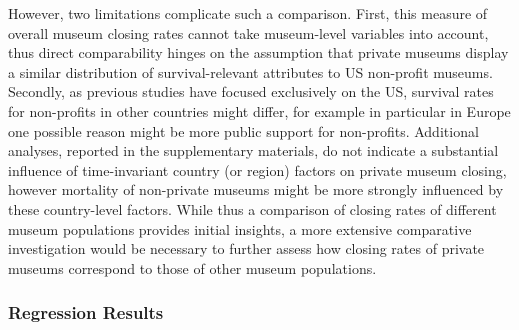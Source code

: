 \documentclass[12pt]{article}
\begin{document}
However, two limitations complicate such a comparison.
First, this measure of overall museum closing rates cannot take museum-level variables into account, thus direct comparability hinges on the assumption that private museums display a similar distribution of survival-relevant attributes to US non-profit museums.
Secondly, as previous studies have focused exclusively on the US, survival rates for non-profits in other countries might differ, for example in particular in Europe one possible reason might be more public support for non-profits.
Additional analyses, reported in the supplementary materials, do not indicate a substantial influence of time-invariant country (or region) factors on private museum closing, however mortality of non-private museums might be more strongly influenced by these country-level factors.
While thus a comparison of closing rates of different museum populations provides initial insights, a more extensive comparative investigation would be necessary to further assess how closing rates of private museums correspond to those of other museum populations.
\subsubsection*{Regression Results}
\end{document}

